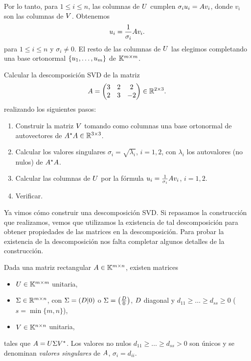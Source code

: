 Por lo tanto, para $1 \le i \le n$, las columnas de $\Ub$ cumplen $\sigma_i \ub_i = \Ab \vb_i$, donde
$v_i$ son las columnas de $\Vb$. Obtenemos
$$
\ub_i = \frac{1}{\sigma_i} \Ab \vb_i.
$$
para $1 \le i \le n$ y $\sigma_i \neq 0$.
El resto de las columnas de $\Ub$ las elegimos completando una base ortonormal $\{\ub_1, \dots, \ub_m\}$ de $\mathbb K^{m \times m}$.

\begin{ejercicio}
Calcular la descomposición SVD de la matriz
$$
\Ab = \begin{pmatrix}
3 & 2 & 2 \\
2 & 3 & -2 \\
\end{pmatrix} \in \R^{2 \times 3}.
$$
realizando los siguientes pasos:
\begin{enumerate}
\item Construir la matriz $\Vb$ tomando como columnas una base ortonormal de autovectores de $\Ab^* \Ab \in \R^{3 \times 3}$.
\item Calcular los valores singulares $\sigma_i = \sqrt{\lambda_i}$, $i = 1,2$, con $\lambda_i$ los autovalores (no nulos) de $\Ab^* \Ab$.
\item Calcular las columnas de $\Ub$ por la fórmula $\ub_i = \frac{1}{\sigma_i} \Ab \vb_i$, $i = 1,2$.
\item Verificar.
\end{enumerate}
\end{ejercicio}

Ya vimos cómo construir una descomposición SVD. Si repasamos la construcción que realizamos, vemos que utilizamos la existencia de tal descomposición para obtener propiedades de las matrices en la descomposición. Para probar la existencia de la descomposición nos falta completar algunos detalles de la construcción.

\begin{teorema}
Dada una matriz rectangular $\Ab \in \K^{m \times n}$, existen matrices
\begin{itemize}
\item $\Ub \in \K^{m \times m}$ unitaria,
\item $\Sigmab \in \R^{m \times n}$, con $\Sigmab = (\Db | 0)$ o $\Sigmab = \left(\frac{\Db}{0}\right)$, $\Db$ diagonal y $d_{11} \ge \dots \ge d_{ss} \ge 0$ ($s = \min\{m,n\}$),
\item $\Vb \in \K^{n \times n}$ unitaria,
\end{itemize}
tales que $\Ab = \Ub \Sigmab \Vb^*$.
Los valores no nulos $d_{11} \ge \dots \ge d_{ss} > 0$ son \'unicos y se denominan \emph{valores singulares} de $\Ab$, $\sigma_i = d_{ii}$.
\end{teorema}

